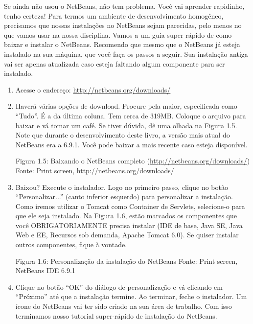 Se ainda não usou o NetBeans, não tem problema. Você vai aprender rapidinho, tenho certeza! Para termos um ambiente de desenvolvimento homogêneo, precisamos que nossas instalações no NetBeans sejam parecidas, pelo menos no que vamos usar na nossa disciplina. Vamos a um guia super-rápido de como baixar e instalar o NetBeans. Recomendo que mesmo que o NetBeans já esteja instalado na sua máquina, que você faça os passos a seguir. Sua instalação antiga vai ser apenas atualizada caso esteja faltando algum componente para ser instalado.

\begin{enumerate}

    \item Acesse o endereço: \url{http://netbeans.org/downloads/}
    
    \item Haverá várias opções de download. Procure pela maior, especificada como ``Tudo''. É a da última coluna. Tem cerca de 319MB. Coloque o arquivo para baixar e vá tomar um café. Se tiver dúvida, dê uma olhada na Figura 1.5. Note que durante o desenvolvimento deste livro, a versão mais atual do NetBeans era a 6.9.1. Você pode baixar a mais recente caso esteja disponível.
    
    Figura 1.5: Baixando o NetBeans completo (\url{http://netbeans.org/downloads/})
    Fonte: Print screen, \url{http://netbeans.org/downloads/}
    
    \item Baixou? Execute o instalador. Logo no primeiro passo, clique no botão ``Personalizar...'' (canto inferior esquerdo) para personalizar a instalação. Como iremos utilizar o Tomcat como Container de Servlets, selecione-o para que ele seja instalado. Na Figura 1.6, estão marcados os componentes que você OBRIGATORIAMENTE precisa instalar (IDE de base, Java SE, Java Web e EE, Recursos sob demanda, Apache Tomcat 6.0). Se quiser instalar outros componentes, fique à vontade.
    
    Figura 1.6: Personalização da instalação do NetBeans
    Fonte: Print screen, NetBeans IDE 6.9.1
    
    \item Clique no botão ``OK'' do diálogo de personalização e vá clicando em ``Próximo'' até que a instalação termine. Ao terminar, feche o instalador. Um ícone do NetBeans vai ter sido criado na sua área de trabalho. Com isso terminamos nosso tutorial super-rápido de instalação do NetBeans.
    
\end{enumerate}

